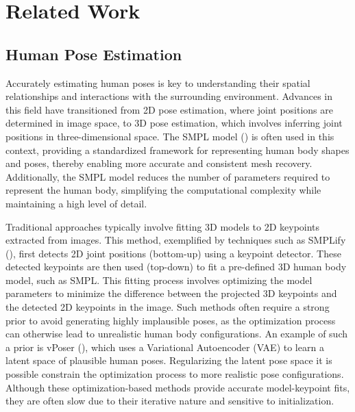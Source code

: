 

\chapter{Related Work}
\section{Human Pose Estimation}
Accurately estimating human poses is key to understanding their spatial relationships and interactions with the surrounding environment. Advances in this field have transitioned from 2D pose estimation, where joint positions are determined in image space, to 3D pose estimation, which involves inferring joint positions in three-dimensional space. The SMPL model (\cite{SMPL:2015}) is often used in this context, providing a standardized framework for representing human body shapes and poses, thereby enabling more accurate and consistent mesh recovery. Additionally, the SMPL model reduces the number of parameters required to represent the human body, simplifying the computational complexity while maintaining a high level of detail.

Traditional approaches typically involve fitting 3D models to 2D keypoints extracted from images. This method, exemplified by techniques such as SMPLify (\cite{BogoSMPLify2016}), first detects 2D joint positions (bottom-up) using a keypoint detector. These detected keypoints are then used (top-down) to fit a pre-defined 3D human body model, such as SMPL. This fitting process involves optimizing the model parameters to minimize the difference between the projected 3D keypoints and the detected 2D keypoints in the image. Such methods often require a strong prior to avoid generating highly implausible poses, as the optimization process can otherwise lead to unrealistic human body configurations. An example of such a prior is vPoser (\cite{SMPL-X:2019}), which uses a Variational Autoencoder (VAE) to learn a latent space of plausible human poses. Regularizing the latent pose space it is possible constrain the optimization process to more realistic pose configurations. Although these optimization-based methods provide accurate model-keypoint fits, they are often slow due to their iterative nature and sensitive to initialization. 

